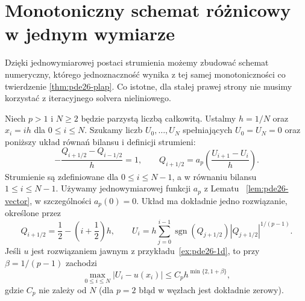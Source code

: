 \section{Monotoniczny schemat różnicowy w jednym wymiarze}
Dzięki jednowymiarowej postaci strumienia możemy
zbudować schemat numeryczny, którego jednoznaczność
wynika z tej samej monotoniczności co twierdzenie
\ref{thm:pde26-plap}. Co istotne, dla stałej prawej
strony nie musimy korzystać z iteracyjnego solvera
nieliniowego.

\begin{twierdzenie}
\label{thm:pde26-discrete}
Niech $p>1$ i $N\ge2$ będzie parzystą liczbą całkowitą.
Ustalmy $h=1/N$ oraz $x_i=ih$ dla $0\le i\le N$.
Szukamy liczb $U_0,\ldots,U_N$ spełniających
$U_0=U_N=0$ oraz poniższy układ równań bilansu i definicji strumieni:
\begin{equation}\label{eq:pde26-discrete}
 -\frac{Q_{i+1/2}-Q_{i-1/2}}h=1,\qquad
 Q_{i+1/2}=a_p\left(\frac{U_{i+1}-U_i}h\right).
\end{equation}
Strumienie są zdefiniowane dla $0\le i\le N-1$,
a w równaniu bilansu $1\le i\le N-1$.
Używamy jednowymiarowej funkcji $a_p$ z Lematu
~\ref{lem:pde26-vector}, w szczególności $a_p(0)=0$.
Układ ma dokładnie jedno rozwiązanie, określone przez
\begin{equation}\label{eq:pde26-flux}
 Q_{i+1/2}=\frac12-\left(i+\frac12\right)h,\qquad
 U_i=h\sum_{j=0}^{i-1}\operatorname{sgn}(Q_{j+1/2})
 |Q_{j+1/2}|^{1/(p-1)}.
\end{equation}
Jeśli $u$ jest rozwiązaniem jawnym z
przykładu~\ref{ex:pde26-1d}, to przy
$\beta=1/(p-1)$ zachodzi
\[
 \max_{0\le i\le N}|U_i-u(x_i)|
 \le C_p h^{\min\{2,1+\beta\}},
\]
gdzie $C_p$ nie zależy od $N$ (dla $p=2$ błąd
w węzłach jest dokładnie zerowy).
\end{twierdzenie}

